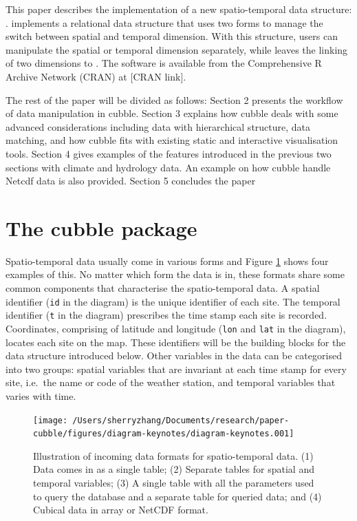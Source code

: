 \documentclass[
]{jss}
\begin{document}
This paper describes the implementation of a new spatio-temporal data
structure: .  implements a relational data
structure that uses two forms to manage the switch between spatial and
temporal dimension. With this structure, users can manipulate the
spatial or temporal dimension separately, while leaves the linking of
two dimensions to . The software is available from the
Comprehensive R Archive Network (CRAN) at {[}CRAN link{]}. \newline

The rest of the paper will be divided as follows: Section 2 presents the
workflow of data manipulation in cubble. Section 3 explains how cubble
deals with some advanced considerations including data with hierarchical
structure, data matching, and how cubble fits with existing static and
interactive visualisation tools. Section 4 gives examples of the
features introduced in the previous two sections with climate and
hydrology data. An example on how cubble handle Netcdf data is also
provided. Section 5 concludes the paper

\newpage

\hypertarget{the-cubble-package}{%
\section{The cubble package}\label{the-cubble-package}}

Spatio-temporal data usually come in various forms and Figure
\ref{fig:illu-input} shows four examples of this. No matter which form
the data is in, these formats share some common components that
characterise the spatio-temporal data. A spatial identifier (\texttt{id}
in the diagram) is the unique identifier of each site. The temporal
identifier (\texttt{t} in the diagram) prescribes the time stamp each
site is recorded. Coordinates, comprising of latitude and longitude
(\texttt{lon} and \texttt{lat} in the diagram), locates each site on the
map. These identifiers will be the building blocks for the data
structure introduced below. Other variables in the data can be
categorised into two groups: spatial variables that are invariant at
each time stamp for every site, i.e.~the name or code of the weather
station, and temporal variables that varies with time.

\begin{CodeChunk}
\begin{figure}

{\centering \texttt{[image: /Users/sherryzhang/Documents/research/paper-cubble/figures/diagram-keynotes/diagram-keynotes.001]} 

}

\caption[Illustration of incoming data formats for spatio-temporal data]{Illustration of incoming data formats for spatio-temporal data. (1) Data comes in as a single table; (2) Separate tables for spatial and temporal variables; (3) A single table with all the parameters used to query the database and a separate table for queried data; and (4) Cubical data in array or NetCDF format.}\label{fig:illu-input}
\end{figure}
\end{CodeChunk}
\end{document}
